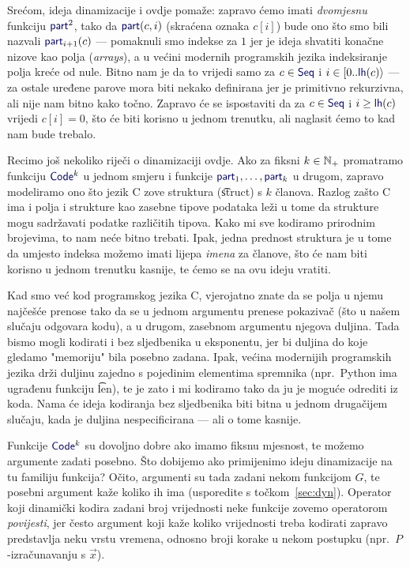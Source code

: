 Srećom, ideja dinamizacije i ovdje pomaže: zapravo ćemo imati \emph{dvomjesnu} funkciju $\f{part}^2$, tako da $\f{part}(c,i)$ (skraćena oznaka $c[i]$) bude ono što smo bili nazvali $\f{part}_{i+1}(c)$ --- pomaknuli smo indekse za $1$ jer je ideja shvatiti konačne nizove kao polja (\emph{arrays}), a u većini modernih programskih jezika indeksiranje polja kreće od nule. Bitno nam je da to vrijedi samo za $c\in\f{Seq}$ i $i\in[0..\f{lh}(c)\rangle$ --- za ostale uređene parove mora biti nekako definirana jer je primitivno rekurzivna, ali nije nam bitno kako točno. Zapravo će se ispostaviti da za $c\in\f{Seq}$ i $i\ge\f{lh}(c)$ vrijedi $c[i]=0$, što će biti korisno u jednom trenutku, ali naglasit ćemo to kad nam bude trebalo.

\begin{napomena}
Recimo još nekoliko riječi o dinamizaciji ovdje. Ako za fiksni $k\in{\mathbb N}_+$ promatramo funkciju $\f{Code}^k$ u jednom smjeru i funkcije $\f{part}_1,\dotsc,\f{part}_k$ u drugom, zapravo modeliramo ono što jezik C zove struktura (\t{struct}) s $k$ članova. Razlog zašto C ima i polja i strukture kao zasebne tipove podataka leži u tome da strukture mogu sadržavati podatke različitih tipova. Kako mi sve kodiramo prirodnim brojevima, to nam neće bitno trebati. Ipak, jedna prednost struktura je u tome da umjesto indeksa možemo imati lijepa \emph{imena} za članove, što će nam biti korisno u jednom trenutku kasnije, te ćemo se na ovu ideju vratiti.
\end{napomena}

Kad smo već kod programskog jezika C, vjerojatno znate da se polja u njemu najčešće prenose tako da se u jednom argumentu prenese pokazivač (što u našem slučaju odgovara kodu), a u drugom, zasebnom argumentu njegova duljina. Tada bismo mogli kodirati i bez sljedbenika u eksponentu, jer bi duljina do koje gledamo "memoriju" bila posebno zadana. Ipak, većina modernijih programskih jezika drži duljinu zajedno s pojedinim elementima spremnika (npr.\ Python ima ugrađenu funkciju \t{len}), te je zato i mi kodiramo tako da ju je moguće odrediti iz koda. Nama će ideja kodiranja bez sljedbenika biti bitna u jednom drugačijem slučaju, kada je duljina nespecificirana --- ali o tome kasnije.

Funkcije $\f{Code}^k$ su dovoljno dobre ako imamo fiksnu mjesnost, te možemo argumente zadati posebno. Što dobijemo ako primijenimo ideju dinamizacije na tu familiju funkcija? Očito, argumenti su tada zadani nekom funkcijom $G$, te posebni argument kaže koliko ih ima (usporedite s točkom~\ref{sec:dyn}). Operator koji dinamički kodira zadani broj vrijednosti neke funkcije zovemo operatorom \emph{povijesti}, jer često argument koji kaže koliko vrijednosti treba kodirati zapravo predstavlja neku vrstu vremena, odnosno broji korake u nekom postupku (npr.\ $P$-izračunavanju s $\vec x$).

